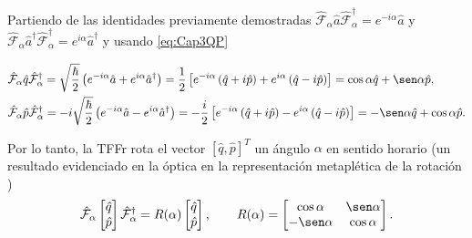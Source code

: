                  Partiendo de las identidades previamente demostradas $\hat{\mathcal{F}}_\alpha \hat{a} \hat{\mathcal{F}}_\alpha^\dagger = e^{-i\alpha}\hat{a}$ y $\hat{\mathcal{F}}_\alpha \hat{a}^\dagger \hat{\mathcal{F}}_\alpha^\dagger = e^{i\alpha}\hat{a}^\dagger$  y usando \ref{eq:Cap3QP}

                \begin{align}
                    & \hat{\mathcal{F}}_\alpha \hat{q} \hat{\mathcal{F}}_\alpha^\dagger = \sqrt{\frac{\hbar}{2}} \left(e^{-i\alpha} \hat{a} + e^{i\alpha}\hat{a}^\dagger \right) = \frac{1}{2}\left[e^{-i\alpha} \left( \hat{q} + i\hat{p} \right) + e^{i\alpha} \left(\hat{q} - i\hat{p} \right)\right] = \cos\alpha \hat{q} + \sen\alpha \hat{p},\\
                    & \hat{\mathcal{F}}_\alpha \hat{p} \hat{\mathcal{F}}_\alpha^\dagger = -i\sqrt{\frac{\hbar}{2}} \left(e^{-i\alpha} \hat{a} - e^{i\alpha}\hat{a}^\dagger \right) = -\frac{i}{2}\left[e^{-i\alpha} \left( \hat{q} + i\hat{p} \right) - e^{i\alpha} \left(\hat{q} - i\hat{p} \right)\right] = -\sen\alpha \hat{q} + \cos\alpha \hat{p}.
                \end{align}

                Por lo tanto, la TFFr rota el vector $[\hat{q},\hat{p}]^T$ un ángulo $\alpha$ en sentido horario (un resultado evidenciado en la óptica en la representación metaplética de la rotación \cite{lohmann1993image,moshinsky1971linear} )
                \begin{equation*}
                    \hat{\mathcal{F}}_\alpha
                    \begin{bmatrix}
                        \hat{q}\\
                        \hat{p}
                    \end{bmatrix}
                    \hat{\mathcal{F}}_\alpha^\dagger = R(\alpha) 
                    \begin{bmatrix}
                        \hat{q}\\
                        \hat{p}
                    \end{bmatrix},
                    \qquad
                    R(\alpha) =
                    \begin{bmatrix}
                        \cos\alpha & \sen\alpha\\
                        -\sen\alpha & \cos\alpha
                    \end{bmatrix}.
                \end{equation*}

